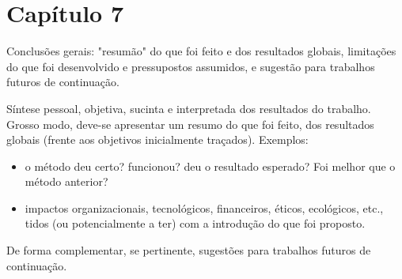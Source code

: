 \chapter{Capítulo 7}

Conclusões gerais: "resumão" do que foi feito e dos resultados globais, limitações do que foi desenvolvido e pressupostos assumidos, e sugestão para trabalhos futuros de continuação.

Síntese pessoal, objetiva, sucinta e interpretada dos resultados do trabalho.
Grosso modo, deve-se apresentar um resumo do que foi feito, dos resultados globais (frente aos objetivos inicialmente traçados). Exemplos:

\begin{itemize}
\item o método deu certo? funcionou? deu o resultado esperado? Foi melhor que o método anterior?
\item impactos organizacionais, tecnológicos, financeiros, éticos, ecológicos, etc., tidos (ou potencialmente a ter) com a introdução do que foi proposto.
\end{itemize}


De forma complementar, se pertinente, sugestões para trabalhos futuros de continuação.